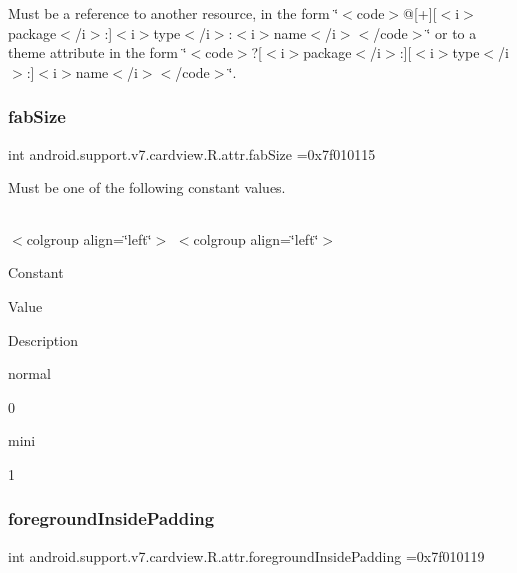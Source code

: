 Must be a reference to another resource, in the form \char`\"{}$<$code$>$@\mbox{[}+\mbox{]}\mbox{[}$<$i$>$package$<$/i$>$\+:\mbox{]}$<$i$>$type$<$/i$>$\+:$<$i$>$name$<$/i$>$$<$/code$>$\char`\"{} or to a theme attribute in the form \char`\"{}$<$code$>$?\mbox{[}$<$i$>$package$<$/i$>$\+:\mbox{]}\mbox{[}$<$i$>$type$<$/i$>$\+:\mbox{]}$<$i$>$name$<$/i$>$$<$/code$>$\char`\"{}. \mbox{\label{classandroid_1_1support_1_1v7_1_1cardview_1_1R_1_1attr_aeac4fc5173601557638982e405fe884d}} 
\subsubsection{\texorpdfstring{fab\+Size}{fabSize}}
{\footnotesize\ttfamily int android.\+support.\+v7.\+cardview.\+R.\+attr.\+fab\+Size =0x7f010115\hspace{0.3cm}{\ttfamily [static]}}

Must be one of the following constant values.

\tabulinesep=1mm
\begin{longtabu} spread 0pt [c]{*{0}{|X[-1]}|}
\hline
\end{longtabu}
$<$colgroup align=\char`\"{}left\char`\"{}$>$ $<$colgroup align=\char`\"{}left\char`\"{}$>$ 

Constant

Value

Description 

{\ttfamily normal}

0

{\ttfamily mini}

1\mbox{\label{classandroid_1_1support_1_1v7_1_1cardview_1_1R_1_1attr_a4951f8432b657bbd76d657546f7f538e}} 
\subsubsection{\texorpdfstring{foreground\+Inside\+Padding}{foregroundInsidePadding}}
{\footnotesize\ttfamily int android.\+support.\+v7.\+cardview.\+R.\+attr.\+foreground\+Inside\+Padding =0x7f010119\hspace{0.3cm}{\ttfamily [static]}}

